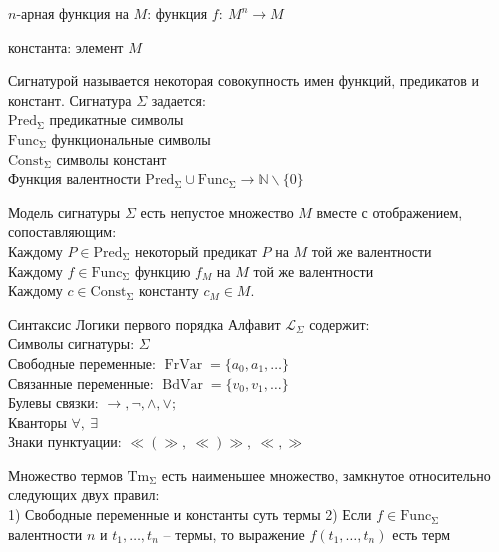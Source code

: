 \begin{defn}
$n$-арная функция на $M$: функция $f:\ M^n \to M$
\end{defn}
\begin{defn}
константа: элемент $M$
\end{defn}
\begin{defn}
Сигнатурой называется некоторая совокупность имен функций, предикатов и констант. Сигнатура $\Sigma$ задается:\\
$\operatorname{Pred_{\Sigma}}$ предикатные символы\\
$\operatorname{Func_{\Sigma}}$ функциональные символы\\
$\operatorname{Const_{\Sigma}}$ символы констант\\
Функция валентности $\operatorname{Pred_{\Sigma}} \cup \operatorname{Func_{\Sigma}} \to \mathbb{N}\backslash \{0\}$
\end{defn}
\begin{defn}
Модель сигнатуры $\Sigma$ есть непустое множество $M$ вместе с отображением, сопоставляющим:\\
Каждому $P \in \operatorname{Pred_{\Sigma}}$ некоторый предикат $P$ на $M$ той же валентности\\
Каждому $f \in \operatorname{Func_{\Sigma}}$ функцию $f_M$ на $M$ той же валентности\\
Каждому $c \in \operatorname{Const_{\Sigma}}$ константу $c_M \in M$.
\end{defn}

Синтаксис Логики первого порядка
\vskip 0.1in
Алфавит $\mathcal{L}_{\Sigma}$ содержит:\\
Символы сигнатуры: $\Sigma$\\
Свободные переменные: $\operatorname{FrVar} = \{a_0, a_1, \ldots\}$\\
Связанные переменные: $\operatorname{BdVar} = \{v_0, v_1, \ldots\}$\\
Булевы связки: $\rightarrow, \neg, \wedge, \vee ;$\\
Кванторы $\forall,\ \exists$\\
Знаки пунктуации: $\ll ( \gg,\ \ll )\gg,\ \ll , \gg$

\begin{defn}
Множество термов $\operatorname{Tm_{\Sigma}}$ есть наименьшее множество, замкнутое относительно следующих двух правил:\\
1) Свободные переменные и константы суть термы
2) Если $f \in \operatorname{Func_{\Sigma}}$ валентности $n$ и $t_1, \ldots, t_n$ -- термы, то выражение $f(t_1, \ldots, t_n)$ есть терм
\end{defn}

